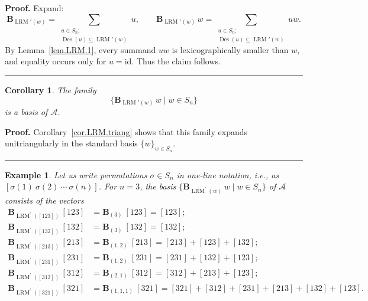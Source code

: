 \documentclass[submission]{FPSAC2026}
\newtheorem{corollary}{Corollary}
\newtheorem{example}{Example}
\newcommand{\Des}{\operatorname{Des}}
\newcommand{\ive}[1]{\left[ #1 \right]}
\newenvironment{proof}[1][Proof]{\noindent\textbf{#1.} }{\ \rule{0.5em}{0.5em}}
\begin{document}
\begin{proof}
Expand:
\[
\mathbf{B}_{\operatorname{LRM}'(w)}
 = \sum_{\substack{u\in S_n;\\\Des(u)\subseteq \operatorname{LRM}'(w)}} u,
\qquad
\mathbf{B}_{\operatorname{LRM}'(w)}\,w
 = \sum_{\substack{u\in S_n;\\\Des(u)\subseteq \operatorname{LRM}'(w)}} uw.
\]
By Lemma~\ref{lem.LRM.1}, every summand $uw$ is lexicographically smaller than $w$, and equality occurs only for $u=\mathrm{id}$.  Thus the claim follows.
\end{proof}


\begin{corollary}
\label{cor.LRM.basis}
The family
\[
\bigl\{
\mathbf{B}_{\operatorname{LRM}'(w)}\, w
\;\big|\; w\in S_n
\bigr\}
\]
is a basis of $\mathcal{A}$.
\end{corollary}


\begin{proof}
Corollary~\ref{cor.LRM.triang} shows that this family expands unitriangularly in the standard basis $\{w\}_{w\in S_n}$.
\end{proof}

\begin{example}
Let us write permutations $\sigma\in S_{n}$ in one-line notation, i.e., as
$\left[  \sigma\left(  1\right)  \ \sigma\left(  2\right)  \ \cdots
\ \sigma\left(  n\right)  \right]  $. For $n=3$, the basis $\bigl\{\mathbf{B}%
_{\operatorname{LRM}^{\prime}(w)}\,w\;\big|\;w\in S_{n}\bigr\}$ of
$\mathcal{A}$ consists of the vectors%
\begin{align*}
\mathbf{B}_{\operatorname{LRM}^{\prime}(\left[  123\right]  )}\,\left[
123\right]    & =\mathbf{B}_{\left(  3\right)  }\ \left[  123\right]  =\left[
123\right]  ;\\
\mathbf{B}_{\operatorname{LRM}^{\prime}(\left[  132\right]  )}\,\left[
132\right]    & =\mathbf{B}_{\left(  3\right)  }\ \left[  132\right]  =\left[
132\right]  ;\\
\mathbf{B}_{\operatorname{LRM}^{\prime}(\left[  213\right]  )}\,\left[
213\right]    & =\mathbf{B}_{\left(  1,2\right)  }\ \left[  213\right]
=\left[  213\right]  +\left[  123\right]  +\left[  132\right]  ;\\
\mathbf{B}_{\operatorname{LRM}^{\prime}(\left[  231\right]  )}\,\left[
231\right]    & =\mathbf{B}_{\left(  1,2\right)  }\ \left[  231\right]
=\left[  231\right]  +\left[  132\right]  +\left[  123\right]  ;\\
\mathbf{B}_{\operatorname{LRM}^{\prime}(\left[  312\right]  )}\,\left[
312\right]    & =\mathbf{B}_{\left(  2,1\right)  }\ \left[  312\right]
=\left[  312\right]  +\left[  213\right]  +\left[  123\right]  ;\\
\mathbf{B}_{\operatorname{LRM}^{\prime}(\left[  321\right]  )}\,\left[
321\right]    & =\mathbf{B}_{\left(  1,1,1\right)  }\ \left[  321\right]
= \ive{321} + \ive{312} + \ive{231} + \ive{213} + \ive{132} + \ive{123}.
\end{align*}
\end{example}
\end{document}
